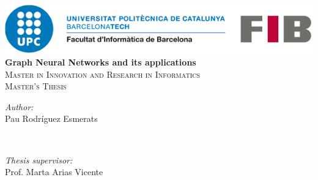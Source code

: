 \begin{titlepage}

\newcommand{\HRule}{\rule{\linewidth}{0.5mm}} 							%
\newenvironment{bottompar}{\par\vspace*{\fill}}{\clearpage}
\center 
\begin{center}
\includegraphics[scale=0.8]{./img/fib3.png}\\[5cm]
 


{ \huge \bfseries Graph Neural Networks and its applications}\\[0.4cm] %
\textsc{\Large Master in Innovation and Research in Informatics}\\[0.5cm] %
\textsc{\large Master's Thesis}\\[3cm] %

 
\begin{bottompar}
\begin{minipage}{0.5\textwidth}
\begin{flushleft} \large
\emph{Author:}\\ Pau Rodríguez Esmerats %
\end{flushleft}
\end{minipage}
~
\begin{minipage}{0.4\textwidth}
\begin{flushright} \large
\emph{Thesis supervisor:} \\
 Prof. Marta Arias Vicente   %
\end{flushright}
\end{minipage}\\[2cm]


\end{bottompar}
\end{center}
\end{titlepage}
